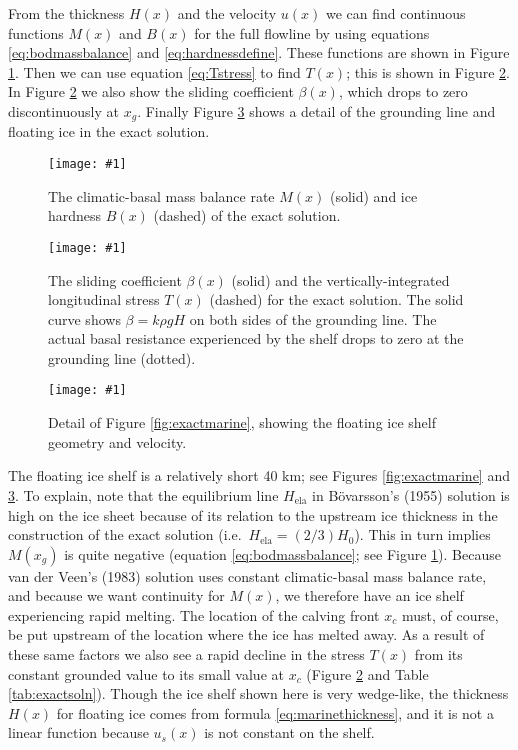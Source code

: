 \documentclass[twocolumn,letterpaper]{igs}
\renewcommand{\dh}{\fontencoding{T1}\selectfont{\symbol{240}}}
\newcommand{\onecol}[1]{\texttt{[image: \#1]}}
\newcommand{\bod}{B\"o\dh varsson\xspace}
\newcommand{\Hela}{H_{\text{ela}}}
\begin{document}
From the thickness $H(x)$ and the velocity $u(x)$ we can find continuous functions $M(x)$ and $B(x)$ for the full  flowline by using equations \eqref{eq:bodmassbalance} and \eqref{eq:hardnessdefine}.  These functions are shown in Figure \ref{fig:exactMB}.  Then we can use equation \eqref{eq:Tstress} to find $T(x)$; this is shown in Figure \ref{fig:exactbetaT}.  In Figure \ref{fig:exactbetaT} we also show the sliding coefficient $\beta(x)$, which drops to zero discontinuously at $x_g$.  Finally Figure \ref{fig:em-detail} shows a detail of the grounding line and floating ice in the exact solution.

\begin{figure}[ht]
\onecol{em-M-B}
\caption{The climatic-basal mass balance rate $M(x)$ (solid) and ice hardness $B(x)$ (dashed) of the exact solution.} \label{fig:exactMB}
\end{figure}

\begin{figure}[ht]
\onecol{em-beta-T}
\caption{The sliding coefficient $\beta(x)$ (solid) and the vertically-integrated longitudinal stress $T(x)$ (dashed) for the exact solution.  The solid curve shows $\beta = k \rho g H$ on both sides of the grounding line.  The actual basal resistance experienced by the shelf drops to zero at the grounding line (dotted).} \label{fig:exactbetaT}
\end{figure}

\begin{figure}[ht]
\onecol{em-geometry-detail}
\caption{Detail of Figure \ref{fig:exactmarine}, showing the floating ice shelf geometry and velocity.} \label{fig:em-detail}
\end{figure}

The floating ice shelf is a relatively short 40 km; see Figures \ref{fig:exactmarine} and \ref{fig:em-detail}.  To explain, note that the equilibrium line $\Hela$ in \bod's (1955) solution is high on the ice sheet because of its relation to the upstream ice thickness in the construction of the exact solution (i.e.~$\Hela = (2/3) H_0$).  This in turn implies $M(x_g)$ is quite negative (equation \eqref{eq:bodmassbalance}; see Figure \ref{fig:exactMB}).  Because van der Veen's (1983) solution uses constant climatic-basal mass balance rate, and because we want continuity for $M(x)$, we therefore have an ice shelf experiencing rapid melting.  The location of the calving front $x_c$ must, of course, be put upstream of the location where the ice has melted away.  As a result of these same factors we also see a rapid decline in the stress $T(x)$ from its constant grounded value to its small value at $x_c$ (Figure \ref{fig:exactbetaT} and Table \ref{tab:exactsoln}).  Though the ice shelf shown here is very wedge-like, the thickness $H(x)$ for floating ice comes from formula \eqref{eq:marinethickness}, and it is not a linear function because $u_s(x)$ is not constant on the shelf.
\end{document}
